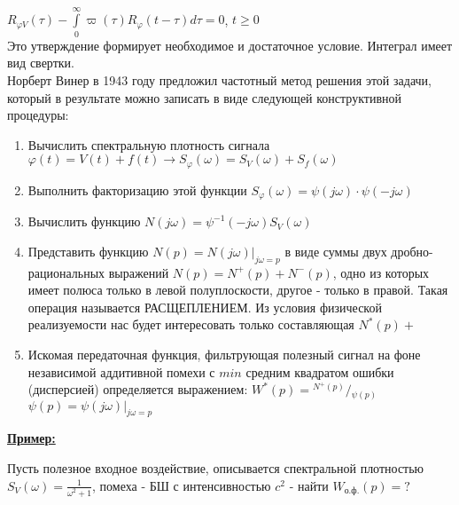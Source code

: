 \documentclass[preprint,russian,a5paper,10pt,twoside,mediummath]{ncc}
\newcommand{\ExampleMy}{\vspace{\baselineskip}\textbf{\underline{Пример:}}\nopagebreak\par}
\begin{document}
\\${{R}_{\varphi V}}\left( \tau  \right)-\int\limits_{0}^{\infty }{\varpi \left( \tau  \right)}{{R}_{\varphi }}\left( t-\tau  \right)d\tau =0$, $t\ge 0$
\\Это утверждение формирует необходимое и достаточное условие. Интеграл имеет вид свертки.
\\Норберт Винер в 1943 году предложил частотный метод решения этой задачи, который в результате можно записать в виде следующей конструктивной процедуры:
\begin{enumerate}
\item Вычислить спектральную плотность сигнала $\varphi \left( t \right)=V\left( t \right)+f\left( t \right)\to {{S}_{\varphi }}\left( \omega  \right)={{S}_{V}}\left( \omega  \right)+{{S}_{f}}\left( \omega  \right)$
\item Выполнить факторизацию этой функции ${{S}_{\varphi }}\left( \omega  \right)=\psi \left( j\omega  \right)\cdot \psi \left( -j\omega  \right)$
\item Вычислить функцию $N\left( j\omega  \right)={{\psi }^{-1}}\left( -j\omega  \right){{S}_{V}}\left( \omega  \right)$
\item Представить функцию $N\left( p \right)={{\left. N\left( j\omega  \right) \right|}_{j\omega =p}}$ в виде суммы двух дробно-рациональных выражений $N\left( p \right)={{N}^{+}}\left( p \right)+{{N}^{-}}\left( p \right)$, одно из которых имеет полюса только  в левой полуплоскости, другое - только в правой. Такая операция называется РАСЩЕПЛЕНИЕМ. Из условия физической реализуемости нас будет интересовать только составляющая ${{N}^{*}}\left( p \right)+$
\item Искомая передаточная функция, фильтрующая полезный сигнал на фоне независимой аддитивной помехи с $min$ средним квадратом ошибки (дисперсией) определяется выражением: ${{W}^{*}}\left( p \right)={}^{{{N}^{+}}\left( p \right)}/{}_{\psi \left( p \right)}$ $\psi \left( p \right)={{\left. \psi \left( j\omega  \right) \right|}_{j\omega =p}}$
\end{enumerate}   
\ExampleMy Пусть полезное входное воздействие, описывается спектральной плотностью ${{S}_{V}}\left( \omega  \right)=\frac{1}{{{\omega }^{2}}+1}$, помеха - БШ с интенсивностью ${{c}^{2}}$ - найти ${{W}_{\textit{о.ф.}}}\left( p \right)=?$
\end{document}
